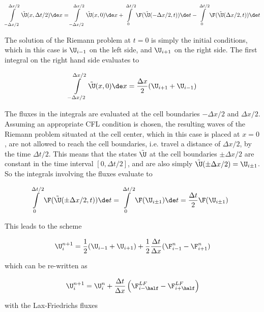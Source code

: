\begin{align}
 \int\limits_{-\Delta x/2}^{\Delta x/2} \tilde{\U}(x, \Delta t/2) \de x  =
 \int\limits_{-\Delta x/2}^{\Delta x/2} \tilde{\U}(x, 0) \de x  +
 \int\limits_{0}^{\Delta t/2} \F(\tilde{\U}(-\Delta x /2, t)) \de t -
 \int\limits_{0}^{\Delta t/2} \F(\tilde{\U}(\Delta x/2, t)) \de t
\end{align}

The solution of the Riemann problem at $t = 0$ is simply the initial conditions, which in this
case is $\U_{i-1}$ on the left side, and $\U_{i+1}$ on the right side. The first integral on
the right hand side evaluates to

\begin{align}
\int\limits_{-\Delta x/2}^{\Delta x/2} \tilde{\U}(x, 0) \de x  =
\frac{\Delta x}{2} (\U_{i+1} + \U_{i-1})
\end{align}

The fluxes in the integrals are evaluated at the cell boundaries $-\Delta x/2$ and $\Delta x/2$.
Assuming an appropriate CFL condition is chosen, the resulting waves of the Riemann problem
situated at the cell center, which in this case is placed at $x = 0$, are not allowed to reach the
cell boundaries, i.e. travel a distance of $\Delta x/2$, by the time $\Delta t/2$. This means that
the states $\tilde{\U}$ at the cell boundaries $\pm \Delta x/2$ are constant in the time interval
$[0, \Delta t/2]$, and are also simply $\tilde{\U}(\pm\Delta x/2) = \U_{i\pm1}$. So the integrals
involving the fluxes evaluate to

\begin{align}
\int\limits_{0}^{\Delta t/2} \F(\tilde{\U}(\pm \Delta x /2, t)) \de t &=
    \int\limits_{0}^{\Delta t/2} \F(\U_{i\pm1}) \de t = \frac{\Delta t}{2} \F(\U_{i\pm1})
\end{align}

This leads to the scheme

\begin{align}
    \U_i^{n+1} = \frac{1}{2} (\U_{i-1} + \U_{i+1}) + \frac{1}{2} \frac{\Delta t}{\Delta x}
(\F^n_{i-1} - \F^n_{i+1})
\end{align}

which can be re-written as

\begin{align}
    \U_i^{n+1} =
        \U_i^n + \frac{\Delta t}{\Delta x} \left(\F_{i-\half}^{LF} - \F_{i+\half}^{LF} \right)
\end{align}

with the Lax-Friedrichs fluxes

